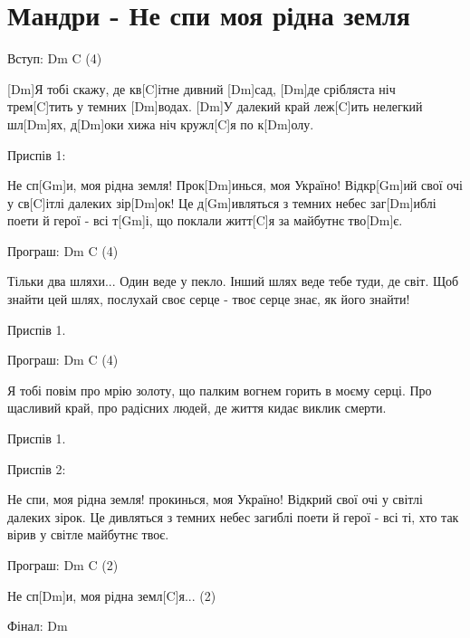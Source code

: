 \section{Мандри - Не спи моя рідна земля}
\begin{guitar}
Вступ:  Dm C  (4)

[Dm]Я тобі скажу,
де кв[C]ітне дивний [Dm]сад,
[Dm]де срібляста ніч
трем[C]тить у темних [Dm]водах.
[Dm]У далекий край
леж[C]ить нелегкий шл[Dm]ях,
д[Dm]оки хижа ніч кружл[C]я по к[Dm]олу.

Приспів 1:

Не сп[Gm]и, моя рідна земля!
Прок[Dm]инься, моя Україно!
Відкр[Gm]ий свої очі у св[C]ітлі далеких зір[Dm]ок!
Це д[Gm]ивляться з темних небес
заг[Dm]иблі поети й герої -
всі т[Gm]і, що поклали житт[C]я за майбутнє тво[Dm]є.

Програш:  Dm C  (4)

Тільки два шляхи...
Один веде у пекло.
Інший шлях веде
тебе туди, де світ.
Щоб знайти цей шлях,
послухай своє серце -
твоє серце знає,
як його знайти!

Приспів 1.

Програш:  Dm C  (4)

Я тобі повім
про мрію золоту,
що палким вогнем
горить в моєму серці.
Про щасливий край,
про радісних людей,
де життя кидає виклик смерти.

Приспів 1.

Приспів 2:

Не спи, моя рідна земля!
прокинься, моя Україно!
Відкрий свої очі у світлі далеких зірок.
Це дивляться з темних небес
загиблі поети й герої -
всі ті, хто так вірив у світле майбутнє твоє.

Програш:  Dm C  (2)

Не сп[Dm]и, моя рідна земл[C]я...  (2)

Фінал:  Dm
\end{guitar}
